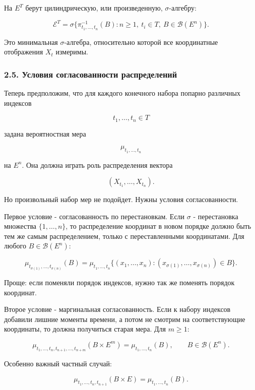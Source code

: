 \documentclass[
  11pt,
  a4paper,
]{article}
\begin{document}
На \(E^T\) берут цилиндрическую, или произведенную, \(\sigma\)-алгебру:

\[
\mathcal E^T
=
\sigma\{\pi_{t_1,\ldots,t_n}^{-1}(B):
n\ge1,\ t_i\in T,\ B\in\mathcal B(E^n)\}.
\]

Это минимальная \(\sigma\)-алгебра, относительно которой все
координатные отображения \(X_t\) измеримы.

\subsubsection{2.5. Условия согласованности
распределений}\label{ux443ux441ux43bux43eux432ux438ux44f-ux441ux43eux433ux43bux430ux441ux43eux432ux430ux43dux43dux43eux441ux442ux438-ux440ux430ux441ux43fux440ux435ux434ux435ux43bux435ux43dux438ux439}

Теперь предположим, что для каждого конечного набора попарно различных
индексов

\[
t_1,\ldots,t_n\in T
\]

задана вероятностная мера

\[
\mu_{t_1,\ldots,t_n}
\]

на \(E^n\). Она должна играть роль распределения вектора

\[
(X_{t_1},\ldots,X_{t_n}).
\]

Но произвольный набор мер не подойдет. Нужны условия согласованности.

Первое условие - согласованность по перестановкам. Если \(\sigma\) -
перестановка множества \(\{1,\ldots,n\}\), то распределение координат в
новом порядке должно быть тем же самым распределением, только с
переставленными координатами. Для любого \(B\in\mathcal B(E^n)\):

\[
\mu_{t_{\sigma(1)},\ldots,t_{\sigma(n)}}(B)
=
\mu_{t_1,\ldots,t_n}
\{(x_1,\ldots,x_n):(x_{\sigma(1)},\ldots,x_{\sigma(n)})\in B\}.
\]

Проще: если поменяли порядок индексов, нужно так же поменять порядок
координат.

Второе условие - маргинальная согласованность. Если к набору индексов
добавили лишние моменты времени, а потом не смотрим на соответствующие
координаты, то должна получиться старая мера. Для \(m\ge1\):

\[
\mu_{t_1,\ldots,t_n,t_{n+1},\ldots,t_{n+m}}
(B\times E^m)
=
\mu_{t_1,\ldots,t_n}(B),
\qquad
B\in\mathcal B(E^n).
\]

Особенно важный частный случай:

\[
\mu_{t_1,\ldots,t_n,t_{n+1}}(B\times E)
=
\mu_{t_1,\ldots,t_n}(B).
\]
\end{document}
